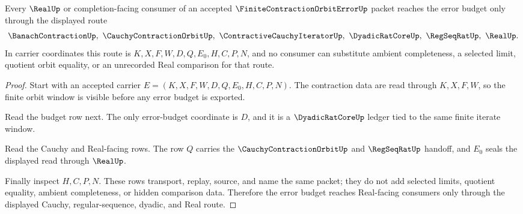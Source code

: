 \begin{theorem}
\label{thm:finite-contraction-orbit-error-cauchy-route}
Every $\RealUp$ or completion-facing consumer of an accepted $\FiniteContractionOrbitErrorUp$ packet reaches the error budget only through the displayed route
$$
\BanachContractionUp,\ \CauchyContractionOrbitUp,\ \ContractiveCauchyIteratorUp,\ \DyadicRatCoreUp,\ \RegSeqRatUp,\ \RealUp .
$$
In carrier coordinates this route is $K,X,F,W,D,Q,E_0,H,C,P,N$, and no consumer can substitute ambient completeness, a selected limit, quotient orbit equality, or an unrecorded Real comparison for that route.
\end{theorem}
\begin{proof}
Start with an accepted carrier $E=(K,X,F,W,D,Q,E_0,H,C,P,N)$. The contraction data are read through $K,X,F,W$, so the finite orbit window is visible before any error budget is exported.

Read the budget row next. The only error-budget coordinate is $D$, and it is a $\DyadicRatCoreUp$ ledger tied to the same finite iterate window.

Read the Cauchy and Real-facing rows. The row $Q$ carries the $\CauchyContractionOrbitUp$ and $\RegSeqRatUp$ handoff, and $E_0$ seals the displayed read through $\RealUp$.

Finally inspect $H,C,P,N$. These rows transport, replay, source, and name the same packet; they do not add selected limits, quotient equality, ambient completeness, or hidden comparison data. Therefore the error budget reaches Real-facing consumers only through the displayed Cauchy, regular-sequence, dyadic, and Real route.
\end{proof}




